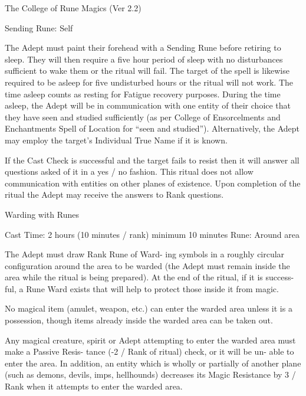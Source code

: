 \begin{Chapter}{The College of Rune Magics (Ver 2.2)}
\begin{ritual}[Q-3]{Sending }
Rune: Self 
\begin{effects}
The Adept must paint their forehead with a 
Sending  Rune  before  retiring  to  sleep.  They  will 
then  require  a  five  hour  period  of  sleep  with  no 
disturbances  sufficient  to  wake  them  or  the  ritual 
will fail. The target of the spell is likewise required 
to be asleep for five undisturbed hours or the ritual 
will not work. The time asleep counts as resting for 
Fatigue recovery purposes. During the time asleep, 
the Adept will be in communication with one entity 
of  their  choice  that  they  have  seen  and  studied 
sufficiently  (as  per  College  of  Ensorcelments  and 
Enchantments  Spell  of  Location  for  “seen  and 
studied”). Alternatively, the Adept may employ the 
target’s Individual True Name if it is known. 

If the Cast Check is successful and the target fails 
to resist then it will answer all questions asked of it 
in  a  yes  /  no  fashion.  This  ritual  does  not  allow 
communication  with  entities  on  other  planes  of 
existence. Upon completion of the ritual the Adept 
may receive the answers to Rank questions. 

\end{effects}
\end{ritual}

\begin{ritual}[Q-4]{Warding with Runes }

Cast  Time:  2  hours  (10  minutes  /  rank)  minimum 
10 minutes 
Rune: Around area 
\begin{effects}
The Adept must draw Rank Rune of Ward-
ing  symbols  in  a  roughly  circular  configuration 
around  the  area  to  be  warded  (the  Adept  must 
remain  inside  the  area  while  the  ritual  is  being 
prepared). At the end of the ritual, if it is success-
ful,  a  Rune  Ward  exists  that  will  help  to  protect 
those inside it from magic. 

No  magical  item  (amulet,  weapon,  etc.)  can  enter 
the  warded  area  unless  it  is  a  possession,  though 
items  already  inside  the  warded  area  can  be  taken 
out. 

Any magical creature, spirit or Adept attempting to 
enter  the  warded  area  must  make  a  Passive  Resis-
tance  (-2  /  Rank  of  ritual)  check,  or  it  will  be  un-
able  to  enter  the  area.  In  addition,  an  entity  which 
is  wholly  or  partially  of  another  plane  (such  as 
demons,  devils,  imps,  hellhounds)  decreases  its 
Magic Resistance by  3  /  Rank  when it attempts  to 
enter the warded area. 


\end{effects}
\end{ritual}
\end{Chapter}
